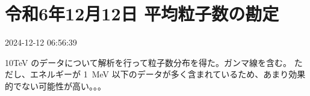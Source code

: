 
\section{令和6年12月12日 平均粒子数の勘定}

2024-12-12 06:56:39

10TeV のデータについて解析を行って粒子数分布を得た。ガンマ線を含む。
ただし、エネルギーが 1~MeV 以下のデータが多く含まれているため、あまり効果的でない可能性が高い。。。